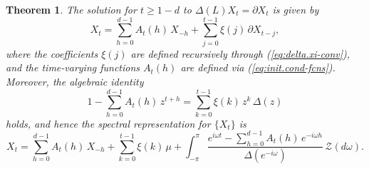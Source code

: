 \documentclass[a4paper]{book}
\newtheorem{Theorem}{Theorem}
\begin{document}
 \begin{Theorem}
 \label{thm:nonstat-rep}
 The solution for $t \geq 1-d$ to $\Delta (L) X_t = \partial X_t$ is given by
\begin{equation}
 \label{eq:nonstatCausalRep}
 X_t  = \sum_{h=0}^{d-1} A_{t} (h) \, X_{-h} + 
  \sum_{j=0}^{t-1} \xi (j) \, \partial X_{t-j},
\end{equation}
 where the coefficients $\xi (j)$ are defined recursively through (\ref{eq:delta.xi-conv}),
  and the time-varying functions $A_t (h)$ are defined via (\ref{eq:init.cond-fcns}).
  Moreover, the algebraic identity 
\begin{equation}
 \label{eq:Identity1}
  1 - \sum_{h=0}^{d-1} A_{t} (h) \, z^{t+h} = \sum_{k=0}^{t-1} \xi (k) \, z^k
  \, \Delta (z)
\end{equation}
holds, and hence the   spectral representation for
 $\{ X_t\}$ is
\begin{equation}
 \label{eq:nonstatRep-spec}
  X_t = \sum_{h=0}^{d-1} A_{t} (h) \, X_{-h}  +
   \sum_{k=0}^{t-1} \xi (k) \, \mu +
  \int_{-\pi}^{\pi}
   \frac{ e^{i \omega t} - \sum_{h=0}^{d-1} A_{t} (h) \,  e^{-i \omega h } 
    }{ \Delta (e^{-i \omega}) } \, \mathcal{Z}  (d\omega).
\end{equation}
\end{Theorem}  
  
\end{document}
